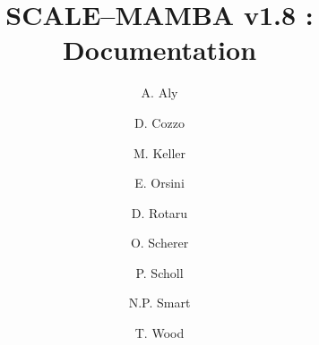 \documentclass{article}
\begin{document}
\newcommand{\mainsection}[1]{\newpage \section{#1}}
\newcommand{\msubsection}[1]{\newpage \subsection{#1}}
\newcommand{\msubsubsection}[1]{\subsubsection{#1}}

\title{SCALE--MAMBA v1.8 : Documentation}
\author{
A. Aly
\and D. Cozzo
\and M. Keller 
\and E. Orsini
\and D. Rotaru 
\and O. Scherer
\and P. Scholl 
\and N.P. Smart
\and T. Wood}

\maketitle

\tableofcontents





























\end{document}
